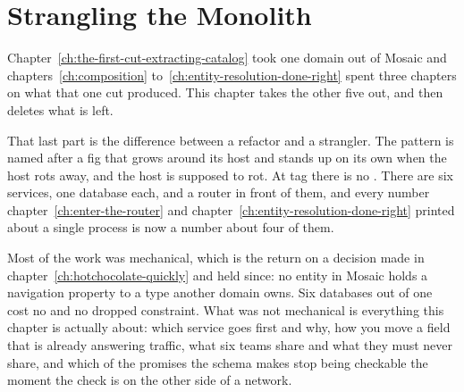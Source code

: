 \chapter{Strangling the Monolith}
\label{ch:strangling-the-monolith}

Chapter~\ref{ch:the-first-cut-extracting-catalog} took one domain out of Mosaic
and chapters~\ref{ch:composition} to~\ref{ch:entity-resolution-done-right} spent
three chapters on what that one cut produced. This chapter takes the other five
out, and then deletes what is left.

That last part is the difference between a refactor and a strangler. The pattern
is named after a fig that grows around its host and stands up on its own when
the host rots away, and the host is supposed to rot. At tag  there is
no . There are six services, one database each, and a
router in front of them, and every number chapter~\ref{ch:enter-the-router} and
chapter~\ref{ch:entity-resolution-done-right} printed about a single process is
now a number about four of them.

Most of the work was mechanical, which is the return on a decision made in
chapter~\ref{ch:hotchocolate-quickly} and held since: no entity in Mosaic holds
a navigation property to a type another domain owns. Six databases out of one
cost no  and no dropped constraint. What was not mechanical is
everything this chapter is actually about: which service goes first and why, how
you move a field that is already answering traffic, what six teams share and
what they must never share, and which of the promises the schema makes stop
being checkable the moment the check is on the other side of a network.








